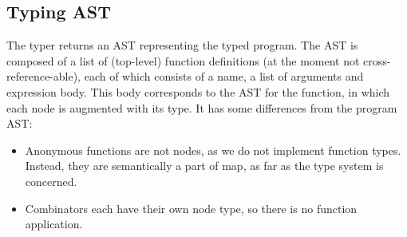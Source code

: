 \documentclass{article}
\begin{document}
  \subsection{Typing AST}
  The typer returns an AST representing the typed program. The AST is composed
  of a list of (top-level) function definitions (at the moment not
  cross-reference-able), each of which consists of a name, a list of arguments
  and expression body.
  This body corresponds to the AST for the function, in which each node is
  augmented with its type. It has some differences from the program AST:
  \begin{itemize}
  \item Anonymous functions are not nodes, as we do not implement function
    types. Instead, they are semantically a part of map, as far as the type
    system is concerned.
  \item Combinators each have their own node type, so there is no function application.
  \end{itemize}
\end{document}
